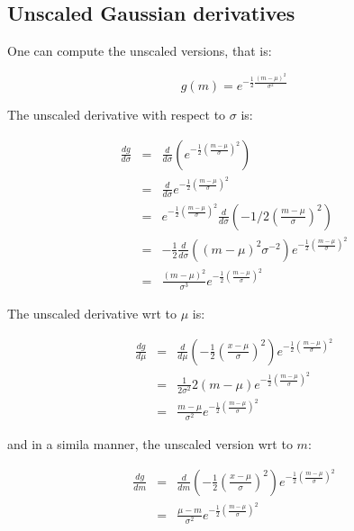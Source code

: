 \documentclass{article}
\begin{document}
\subsection{Unscaled Gaussian derivatives}
One can compute	the unscaled versions, that is:

\begin{equation}
	g(m) = e^{-\frac{1}{2} \frac{(m - \mu)^2}{\sigma^2}}
\end{equation}


The unscaled derivative with respect to $\sigma$ is:

\begin{eqnarray}
	\frac{d g}{d \sigma}&=&\frac{d}{d \sigma}\left(e^{-\frac{1}{2} \left(\frac{m - \mu}{\sigma}\right)^2} \right) \\
	&=&\frac{d}{d \sigma} e^{-\frac{1}{2} \left(\frac{m - \mu}{\sigma}\right)^2}\\
	&=&e^{-\frac{1}{2} \left(\frac{m - \mu}{\sigma}\right)^2} \frac{d}{d \sigma} \left(-1/2 \left(\frac{m - \mu}{\sigma} \right)^2 \right) \\
	&=&-\frac{1}{2} \frac{d}{d \sigma} \left((m-\mu)^2 \sigma^{-2} \right) e^{-\frac{1}{2} \left(\frac{m - \mu}{\sigma}\right)^2}\\
	&=&\frac{(m-\mu)^2}{\sigma^3}e^{-\frac{1}{2} \left(\frac{m - \mu}{\sigma}\right)^2}
\end{eqnarray}


The unscaled derivative wrt to $\mu$ is:

\begin{eqnarray}
	\frac{d g}{d \mu}&=&\frac{d}{d \mu}\left( -\frac{1}{2} \left(\frac{x-\mu}{\sigma}\right)^2 \right) e^{-\frac{1}{2} \left(\frac{m - \mu}{\sigma}\right)^2} \\
	&=&\frac{1}{2 \sigma ^2} 2 (m-\mu)  e^{-\frac{1}{2} \left(\frac{m - \mu}{\sigma}\right)^2}\\
	&=& \frac{m - \mu}{\sigma ^2} e^{-\frac{1}{2} \left(\frac{m - \mu}{\sigma}\right)^2}
\end{eqnarray}	


and in a simila manner, the unscaled version wrt to $m$:

\begin{eqnarray}
	\frac{d g}{d m}&=&\frac{d}{d m}\left( -\frac{1}{2} \left(\frac{x-\mu}{\sigma}\right)^2 \right) e^{-\frac{1}{2} \left(\frac{m - \mu}{\sigma}\right)^2} \\
	&=& \frac{\mu-m}{\sigma ^2} e^{-\frac{1}{2} \left(\frac{m - \mu}{\sigma}\right)^2}
\end{eqnarray}	
\end{document}
